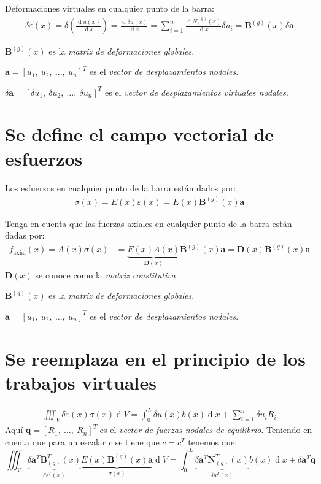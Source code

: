 \documentclass[12pt,letterpaper,landscape]{article}
\newcommand{\ve}[1]{{\boldsymbol{#1}}}
\newcommand{\ma}[1]{{\boldsymbol{#1}}}
\newcommand{\dd}{\operatorname{d} \!}
\begin{document}
Deformaciones virtuales  en cualquier punto de la barra:
\begin{align}
\delta \varepsilon(x) = \delta \left(\frac{\dd u(x)}{\dd x}\right) = \frac{\dd \delta u(x)}{\dd x} = \sum_{i=1}^n \frac{\dd N_i^{(g)}(x)}{\dd x} \delta u_i =
\ma{B}^{(g)}(x) \delta \ve{a}
\end{align}

$\ma{B}^{(g)}(x)$ es la \emph{matriz de deformaciones globales}.

$\ve{a} = [u_1,\ u_2,\ \ldots, \ u_n]^T$ es el \emph{vector de desplazamientos nodales}.

$\delta\ve{a} = [\delta u_1,\ \delta u_2,\ \ldots, \ \delta u_n]^T$ es el \emph{vector de desplazamientos virtuales nodales}.

\newpage

\section{Se define el campo vectorial de esfuerzos}
Los esfuerzos en cualquier punto de la barra están dados por:
\begin{align}
\sigma(x) = E(x) \varepsilon(x) = E(x) \ma{B}^{(g)}(x) \ve{a}
\end{align}

Tenga en cuenta que las fuerzas axiales en cualquier punto de la barra están dadas por:
\begin{align}
f_{\text{axial}}(x) = A(x) \sigma(x) &= \underbrace{E(x) A(x)}_{\ma{D}(x)} \ma{B}^{(g)}(x)
\ve{a} = \ma{D}(x) \ma{B}^{(g)}(x) \ve{a}
\end{align}
$\ma{D}(x)$ se conoce como la \emph{matriz constitutiva}

$\ma{B}^{(g)}(x)$ es la \emph{matriz de deformaciones globales}.

$\ve{a} = [u_1,\ u_2,\ \ldots, \ u_n]^T$ es el \emph{vector de desplazamientos nodales}.

\newpage
\section{Se reemplaza en el principio de los trabajos virtuales}
\begin{align}
\iiint_{V} \delta\varepsilon(x) \sigma(x) \dd V = \int_{0}^{L} \delta u(x) b(x) \dd x + \sum_{i=1}^n \delta u_i R_i
\end{align}
Aquí $\ve{q} = [R_1,\ \ldots,\ R_n]^T$ es el \emph{vector de fuerzas nodales de equilibrio}. Teniendo en cuenta que para un escalar $c$ se tiene que $c = c^T$ tenemos que:
\begin{equation}
\iiint_{V} \underbrace{\delta \ve{a}^T \ma{B}_{(g)}^T(x)}_{\delta\varepsilon^T(x)} \underbrace{E(x) \ma{B}^{(g)}(x) \ve{a}}_{\sigma(x)} \dd V = \int_{0}^{L} \underbrace{\delta \ve{a}^T \ma{N}_{(g)}^T(x)}_{\delta u^T(x)} b(x) \dd x +
\delta \ma{a}^T \ma{q}
\end{equation}
\end{document}
